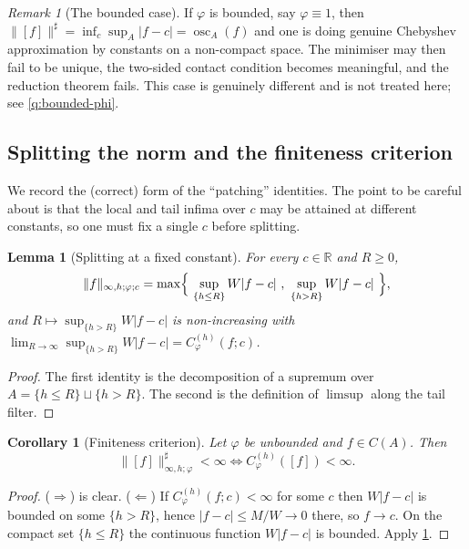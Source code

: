 \documentclass[11pt,a4paper]{article}
\numberwithin{equation}{section}
\theoremstyle{plain}
\newtheorem{lemma}[theorem]{Lemma}
\newtheorem{corollary}[theorem]{Corollary}
\theoremstyle{definition}
\theoremstyle{remark}
\newtheorem{remark}[theorem]{Remark}
\newcommand{\R}{\mathbb{R}}
\DeclareMathOperator{\osc}{osc}
\begin{document}
\begin{remark}[The bounded case]\label{rem:bounded-phi}
If $\varphi$ is bounded, say $\varphi\equiv1$, then
$\|[f]\|^{\sharp}=\inf_c\sup_A|f-c|=\osc_A(f)$ and one is doing genuine Chebyshev
approximation by constants on a non-compact space. The minimiser may then fail to be
unique, the two-sided contact condition becomes meaningful, and the reduction theorem
fails. This case is genuinely different and is not treated here; see
\cref{q:bounded-phi}.
\end{remark}

\subsection{Splitting the norm and the finiteness criterion}

We record the (correct) form of the ``patching'' identities. The point to be careful about
is that the local and tail infima over $c$ may be attained at different constants, so one
must fix a single $c$ before splitting.

\begin{lemma}[Splitting at a fixed constant]\label{lem:splitting}
For every $c\in\R$ and $R\ge0$,
\[
\|f\|_{\infty,h;\varphi;c}
=\max\Bigl\{\ \sup_{\{h\le R\}}W|f-c|\ ,\ \sup_{\{h>R\}}W|f-c|\ \Bigr\},
\]
and $R\mapsto \sup_{\{h> R\}}W|f-c|$ is non-increasing with
$\lim_{R\to\infty}\sup_{\{h>R\}}W|f-c|=C^{(h)}_\varphi(f;c)$.
\end{lemma}

\begin{proof}
The first identity is the decomposition of a supremum over $A=\{h\le R\}\sqcup\{h>R\}$.
The second is the definition of $\limsup$ along the tail filter.
\end{proof}

\begin{corollary}[Finiteness criterion]\label{cor:finiteness}
Let $\varphi$ be unbounded and $f\in C(A)$. Then
\[
\|[f]\|^{\sharp}_{\infty,h;\varphi}<\infty
\iff
C^{(h)}_\varphi([f])<\infty .
\]
\end{corollary}

\begin{proof}
($\Rightarrow$) is clear. ($\Leftarrow$) If $C^{(h)}_\varphi(f;c)<\infty$ for some $c$
then $W|f-c|$ is bounded on some $\{h>R\}$, hence $|f-c|\le M/W\to0$ there, so $f\to c$.
On the compact set $\{h\le R\}$ the continuous function $W|f-c|$ is bounded. Apply
\cref{lem:splitting}.
\end{proof}
\end{document}
